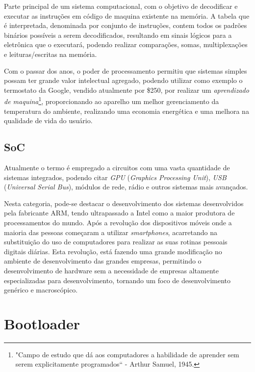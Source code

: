 Parte principal de um sistema computacional, com o objetivo de decodificar e executar as instruções em código de maquina existente na memória\cite{Patterson:2008:COD:1502247}. A tabela que é interpretada, denominada por conjunto de instruções, contem todos os padrões binários possíveis a serem decodificados, resultando em sinais lógicos para a eletrônica que o executará, podendo realizar comparações, somas, multiplexações e leituras/escritas na memória.

Com o passar dos anos, o poder de processamento permitiu que sistemas simples possam ter grande valor intelectual agregado, podendo utilizar como exemplo o termostato da Google, vendido atualmente por \$250, por realizar um \textit{aprendizado de maquina}\footnote{"Campo de estudo que dá aos computadores a habilidade de aprender sem serem explicitamente programados`` -  Arthur Samuel, 1945.}, proporcionando ao aparelho um melhor gerenciamento da temperatura do ambiente, realizando uma economia energética e uma melhora na qualidade de vida do usuário.

\subsection{SoC}

Atualmente o termo é empregado a circuitos com uma vasta quantidade de sistemas integrados, podendo citar  \textit{GPU} (\textit{Graphics Processing Unit}), \textit{USB} (\textit{Universal Serial Bus}), módulos de rede, rádio e outros sistemas mais avançados.


Nesta categoria, pode-se destacar o desenvolvimento dos sistemas desenvolvidos pela fabricante ARM, tendo ultrapassado a Intel como a maior produtora de processamentos do mundo.
Após a revolução dos dispositivos móveis onde a maioria das pessoas começaram a utilizar \textit{smartphones}, acarretando na substituição do uso de computadores para realizar as suas rotinas pessoais digitais diárias. Esta revolução, está fazendo uma grande modificação no ambiente de desenvolvimento das grandes empresas, permitindo o desenvolvimento de hardware sem a necessidade de empresas altamente especializadas para desenvolvimento, tornando um foco de desenvolvimento genérico e macroscópico.


\section{Bootloader}

